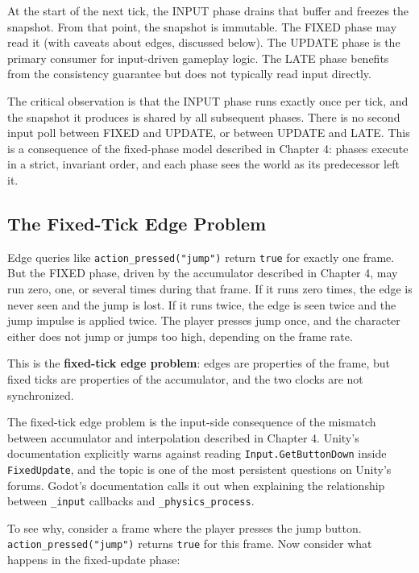 \documentclass[
  11pt,
  letterpaper,
  DIV=11,
  numbers=noendperiod,
  twoside,
  open=right]{scrreprt}
\begin{document}
At the start of the next tick, the INPUT phase drains that buffer and
freezes the snapshot. From that point, the snapshot is immutable. The
FIXED phase may read it (with caveats about edges, discussed below). The
UPDATE phase is the primary consumer for input-driven gameplay logic.
The LATE phase benefits from the consistency guarantee but does not
typically read input directly.

The critical observation is that the INPUT phase runs exactly once per
tick, and the snapshot it produces is shared by all subsequent phases.
There is no second input poll between FIXED and UPDATE, or between
UPDATE and LATE. This is a consequence of the fixed-phase model
described in Chapter 4: phases execute in a strict, invariant order, and
each phase sees the world as its predecessor left it.



\subsection{The Fixed-Tick Edge
Problem}\label{the-fixed-tick-edge-problem}

Edge queries like \texttt{action\_pressed("jump")} return \texttt{true}
for exactly one frame. But the FIXED phase, driven by the accumulator
described in Chapter 4, may run zero, one, or several times during that
frame. If it runs zero times, the edge is never seen and the jump is
lost. If it runs twice, the edge is seen twice and the jump impulse is
applied twice. The player presses jump once, and the character either
does not jump or jumps too high, depending on the frame rate.

This is the \textbf{fixed-tick edge problem}: edges are properties of
the frame, but fixed ticks are properties of the accumulator, and the
two clocks are not synchronized.

The fixed-tick edge problem is the input-side consequence of the
mismatch between accumulator and interpolation described in Chapter 4.
Unity's documentation explicitly warns against reading
\texttt{Input.GetButtonDown} inside \texttt{FixedUpdate}, and the topic
is one of the most persistent questions on Unity's forums. Godot's
documentation calls it out when explaining the relationship between
\texttt{\_input} callbacks and \texttt{\_physics\_process}.

To see why, consider a frame where the player presses the jump button.
\texttt{action\_pressed("jump")} returns \texttt{true} for this frame.
Now consider what happens in the fixed-update phase:
\end{document}
